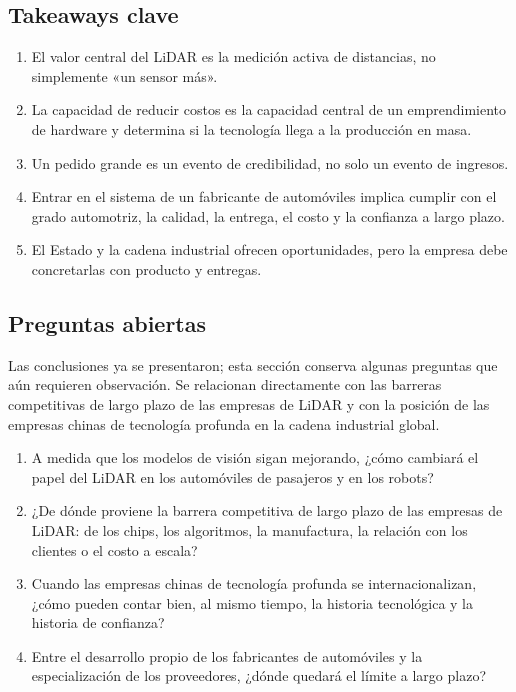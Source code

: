\documentclass[a4paper]{article}
\begin{document}
\subsection{Takeaways clave}

\begin{enumerate}
\item El valor central del LiDAR es la medición activa de distancias, no simplemente «un sensor más».
\item La capacidad de reducir costos es la capacidad central de un emprendimiento de hardware y determina si la tecnología llega a la producción en masa.
\item Un pedido grande es un evento de credibilidad, no solo un evento de ingresos.
\item Entrar en el sistema de un fabricante de automóviles implica cumplir con el grado automotriz, la calidad, la entrega, el costo y la confianza a largo plazo.
\item El Estado y la cadena industrial ofrecen oportunidades, pero la empresa debe concretarlas con producto y entregas.
\end{enumerate}

\subsection{Preguntas abiertas}

Las conclusiones ya se presentaron; esta sección conserva algunas preguntas que aún requieren observación. Se relacionan directamente con las barreras competitivas de largo plazo de las empresas de LiDAR y con la posición de las empresas chinas de tecnología profunda en la cadena industrial global.

\begin{enumerate}
\item A medida que los modelos de visión sigan mejorando, ¿cómo cambiará el papel del LiDAR en los automóviles de pasajeros y en los robots?
\item ¿De dónde proviene la barrera competitiva de largo plazo de las empresas de LiDAR: de los chips, los algoritmos, la manufactura, la relación con los clientes o el costo a escala?
\item Cuando las empresas chinas de tecnología profunda se internacionalizan, ¿cómo pueden contar bien, al mismo tiempo, la historia tecnológica y la historia de confianza?
\item Entre el desarrollo propio de los fabricantes de automóviles y la especialización de los proveedores, ¿dónde quedará el límite a largo plazo?
\end{enumerate}
\end{document}
